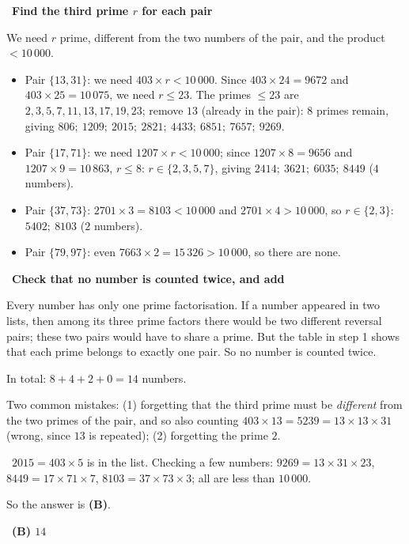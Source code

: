 \documentclass[11pt]{article}
\providecommand{\AnsWord}{Đáp số}
\newcommand{\ans}[1]{\par\smallskip{\bfseries\color{tmGreen!88!black}\AnsWord:}\ {\bfseries\color{AnsRed}#1}\par}
\newcommand{\step}[2]{\par\smallskip\noindent{\bfseries\color{tmBlue!85!black}\StepWord~#1.}\ {\bfseries #2}\par\nopagebreak}
\newcommand{\verify}[1]{\par\smallskip\noindent{\bfseries\color{tmGreen!80!black}\faCheckCircle\ \CheckWord}\ #1\par}
\def\AnsWord{Answer}
\def\StepWord{Step}
\def\CheckWord{Check:}
\begin{document}
{\step{3}{Find the third prime $r$ for each pair}
We need $r$ prime, different from the two numbers of the pair, and the product $<10\,000$.
\begin{itemize}[leftmargin=1.2em,itemsep=1pt,topsep=2pt]
\item Pair $\{13,31\}$: we need $403\times r<10\,000$. Since $403\times24=9672$ and $403\times25=10\,075$, we need $r\le23$.
The primes $\le23$ are $2,3,5,7,11,13,17,19,23$; remove $13$ (already in the pair): $8$ primes remain, giving
$806;\ 1209;\ 2015;\ 2821;\ 4433;\ 6851;\ 7657;\ 9269$.
\item Pair $\{17,71\}$: we need $1207\times r<10\,000$; since $1207\times8=9656$ and $1207\times9=10\,863$, $r\le8$:
$r\in\{2,3,5,7\}$, giving $2414;\ 3621;\ 6035;\ 8449$ ($4$ numbers).
\item Pair $\{37,73\}$: $2701\times3=8103<10\,000$ and $2701\times4>10\,000$, so $r\in\{2,3\}$: $5402;\ 8103$ ($2$ numbers).
\item Pair $\{79,97\}$: even $7663\times2=15\,326>10\,000$, so there are none.
\end{itemize}

\step{4}{Check that no number is counted twice, and add}
\begin{proofbox}Every number has only one prime factorisation. If a number appeared in two lists, then among its three prime factors there
would be two different reversal pairs; these two pairs would have to share a prime. But the table in step 1 shows that each prime belongs
to exactly one pair. So no number is counted twice.\end{proofbox}
In total: $8+4+2+0=14$ numbers.
\begin{warnbox}Two common mistakes: (1) forgetting that the third prime must be \emph{different} from the two primes of the pair, and so
also counting $403\times13=5239=13\times13\times31$ (wrong, since $13$ is repeated); (2) forgetting the prime $2$.\end{warnbox}
\verify{$2015=403\times5$ is in the list. Checking a few numbers: $9269=13\times31\times23$, $8449=17\times71\times7$,
$8103=37\times73\times3$; all are less than $10\,000$.}
So the answer is \textbf{(B)}.
\ans{(B) $14$}
}
\end{document}
